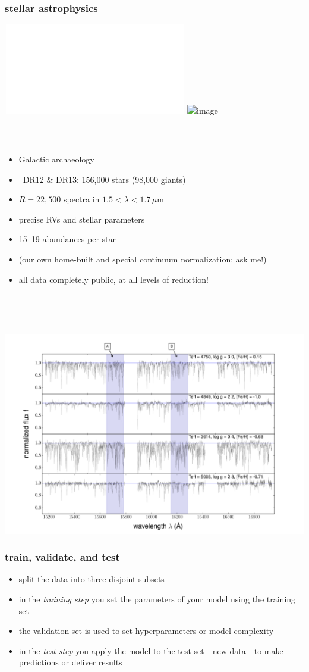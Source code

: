 \documentclass[pdftex]{beamer}
\begin{document}
\begin{frame}
  \frametitle{stellar astrophysics}
  \,\hfill\includegraphics<1>[height=\figureheight]{../documents/paper1/plots/four_examples3.pdf}
         \includegraphics<2>[height=\figureheight]{../documents/paper1/plots/iso2_2.png}
\end{frame}

\begin{frame}
  \frametitle{\sdssiii\ \apogee}
  \begin{itemize}
  \item Galactic archaeology
  \item \apogee\ DR12 \& DR13: 156,000 stars (98,000 giants)
  \item $R=22,500$ spectra in $1.5<\lambda<1.7\,\mu\mathrm{m}$
  \item precise RVs and stellar parameters
  \item 15--19 abundances per star
  \item (our own home-built and special continuum normalization; ask me!)
  \item all data completely public, at all levels of reduction!
  \end{itemize}
\end{frame}

\begin{frame}
  \frametitle{\sdssiii\ \apogee}
  \,\hfill\includegraphics[height=\figureheight]{../documents/paper1/plots/four_examples3.pdf}
\end{frame}

\begin{frame}
  \frametitle{train, validate, and test}
  \begin{itemize}
  \item split the data into three disjoint subsets
  \item in the \emph{training step} you set the parameters of your model using the training set
  \item the validation set is used to set hyperparameters or model complexity
  \item in the \emph{test step} you apply the model to the test set---new data---to make predictions or deliver results
  \end{itemize}
\end{frame}
\end{document}
